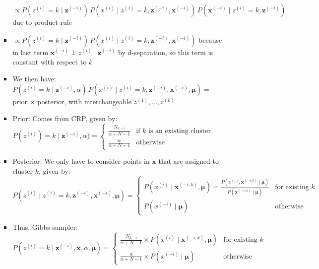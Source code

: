 \begin{itemize}
\begin{itemize}
\begin{itemize}
            $
            \propto P(z^{(i)} = k \mid \boldsymbol{z}^{(-i)}) \, P(x^{(i)} \mid z^{(i)} = k, \boldsymbol{z}^{(-i)}, \boldsymbol{x}^{(-i)}) \, P(\boldsymbol{x}^{(-i)} \mid z^{(i)} = k, \boldsymbol{z}^{(-i)})
            $ due to product rule
            \item 
            $
            \propto P(z^{(i)} = k \mid \boldsymbol{z}^{(-i)}) \, P(x^{(i)} \mid z^{(i)} = k, \boldsymbol{z}^{(-i)}, \boldsymbol{x}^{(-i)})
            $ because in last term $\boldsymbol{x}^{(-i)} \perp z^{(i)} \mid \boldsymbol{z}^{(-i)}$
            by d-separation, so this term is constant with respect to $k$ 
            \item We then have:
            $
            P(z^{(i)} = k \mid \boldsymbol{z}^{(-i)}, \alpha) \, P(x^{(i)} \mid z^{(i)} = k, \boldsymbol{z}^{(-i)}, \boldsymbol{x}^{(-i)}, \boldsymbol{\mu})
            =$ prior $\times$ posterior, with interchangeable $z^{(1)},...,z^{(k)}$
            \item Prior: Comes from CRP, given by:
            $
            P(z^{(i)}) = k \mid \boldsymbol{z}^{(-i)}, \alpha) =
            \begin{cases}
                \frac{N_{k, -i}}{\alpha + N - 1} & \textrm{if $k$ is an existing cluster} \\
                \frac{\alpha}{\alpha + N - 1} & \textrm{otherwise}
            \end{cases}
            $
            \item Posterior: We only have to consider points in $\boldsymbol{x}$ that are assigned to cluster $k$, given by:
            $
            P(z^{(i)} \mid z^{(i)} = k, \boldsymbol{z}^{(-i)}, \boldsymbol{x}^{(-i)}, \boldsymbol{\mu}) =
            \begin{cases}
                P(x^{(i)} \mid \boldsymbol{x}^{(-i,k)}, \boldsymbol{\mu}) =
                \frac{P(x^{(i)}, \boldsymbol{x}^{(-i,k)} \mid \boldsymbol{\mu})}{P(\boldsymbol{x}^{(-i,k)} \mid \boldsymbol{\mu})} & \textrm{for existing } k\\
                P(x^{(-i)} \mid \boldsymbol{\mu}) & \textrm{otherwise}
            \end{cases}
            $
            \item Thus, Gibbs sampler: 
            $
            P(z^{(i)} = k \mid \boldsymbol{z}^{(-i)}, \boldsymbol{x}, \alpha, \boldsymbol{\mu}) =
            \begin{cases}
                \frac{N_{k, -i}}{\alpha + N - 1} \times P(x^{(i)} \mid \boldsymbol{x}^{(-i,k)}, \boldsymbol{\mu}) & \textrm{for existing } k\\
                \frac{\alpha}{\alpha + N - 1} \times P(x^{(-i)} \mid \boldsymbol{\mu}) & \textrm{otherwise}
            \end{cases}
            $
        \end{itemize}
    \end{itemize}
\end{itemize}


